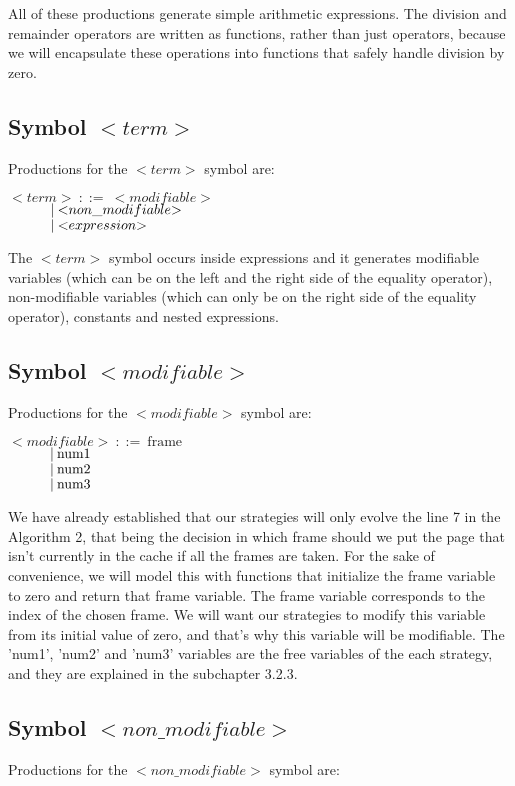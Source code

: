 All of these productions generate simple arithmetic expressions. The division and remainder operators are written as functions, rather than just operators, because we will encapsulate these operations into functions that safely handle division by zero.

\subsection{Symbol ${<}term{>}$}
Productions for the ${<}term{>}$ symbol are:

\noindent
$ {<}term{>}\:::=\:{<}modifiable{>} $\\
$ \indent\indent |\:{<}non\_modifiable{>} $\\
$ \indent\indent |\:{<}expression{>} $

The ${<}term{>}$ symbol occurs inside expressions and it generates modifiable variables (which can be on the left and the right side of the equality operator), non-modifiable variables (which can only be on the right side of the equality operator), constants and nested expressions.

\subsection{Symbol ${<}modifiable{>}$}
Productions for the ${<}modifiable{>}$ symbol are:

\noindent
$ {<}modifiable{>}\:::=\:\text{frame} $\\
$ \indent\indent |\:\text{num1} $\\
$ \indent\indent |\:\text{num2} $\\
$ \indent\indent |\:\text{num3} $

We have already established that our strategies will only evolve the line 7 in the Algorithm 2, that being the decision in which frame should we put the page that isn't currently in the cache if all the frames are taken. For the sake of convenience, we will model this with functions that initialize the frame variable to zero and return that frame variable. The frame variable corresponds to the index of the chosen frame. We will want our strategies to modify this variable from its initial value of zero, and that's why this variable will be modifiable. The 'num1', 'num2' and 'num3' variables are the free variables of the each strategy, and they are explained in the subchapter 3.2.3.

\subsection{Symbol ${<}non\_modifiable{>}$}
Productions for the ${<}non\_modifiable{>}$ symbol are:

